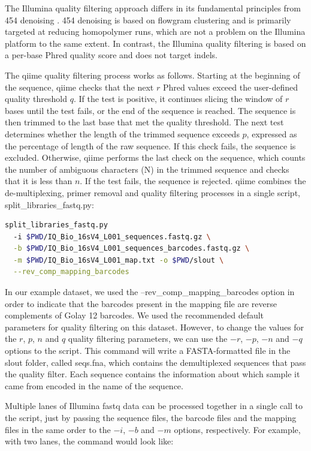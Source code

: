 The Illumina quality filtering approach differs in its fundamental principles from
454 denoising \cite{Quince2009, Reeder2010}. 454 denoising is based on flowgram
clustering \cite{Quince2009, Quince2011} and is primarily targeted at reducing
homopolymer runs, which are not a problem on the Illumina platform to the same extent.
In contrast, the Illumina quality filtering is based on a per-base Phred quality score
and does not target indels.

The \gls{qiime} quality filtering process works as follows. Starting at the
beginning of the sequence, \gls{qiime} checks that the next $r$ Phred values exceed
the user-defined quality threshold $q$. If the test is positive, it continues
slicing the window of $r$ bases until the test fails, or the end of the sequence
is reached. The sequence is then trimmed to the last base that met the quality
threshold. The next test determines whether the length of the trimmed sequence
exceeds $p$, expressed as the percentage of length of the raw sequence. If this
check fails, the sequence is excluded. Otherwise, \gls{qiime} performs the last
check on the sequence, which counts the number of ambiguous characters (N) in the
trimmed sequence and checks that it is less than $n$. If the test fails, the
sequence is rejected. \gls{qiime} combines the de-multiplexing, primer removal and
quality filtering processes in a single script, split\_libraries\_fastq.py:

\begin{lstlisting}[language=bash]
split_libraries_fastq.py
  -i $PWD/IQ_Bio_16sV4_L001_sequences.fastq.gz \
  -b $PWD/IQ_Bio_16sV4_L001_sequences_barcodes.fastq.gz \
  -m $PWD/IQ_Bio_16sV4_L001_map.txt -o $PWD/slout \
  --rev_comp_mapping_barcodes
\end{lstlisting}

In our example dataset, we used the --rev\_comp\_mapping\_barcodes option in order
to indicate that the barcodes present in the mapping file are reverse complements of
Golay 12 barcodes. We used the recommended default parameters for quality filtering
on this dataset. However, to change the values for the $r$, $p$, $n$ and $q$ quality
filtering parameters, we can use the $-r$, $-p$, $-n$ and $-q$ options to the script.
This command will write a FASTA-formatted file in the slout folder, called seqs.fna,
which contains the demultiplexed sequences that pass the quality filter. Each sequence
contains the information about which sample it came from encoded in the name of the sequence.

Multiple lanes of Illumina fastq data can be processed together in a single call
to the script, just by passing the sequence files, the barcode files and the mapping
files in the same order to the $-i$, $-b$ and $-m$ options, respectively. For example,
with two lanes, the command would look like:

